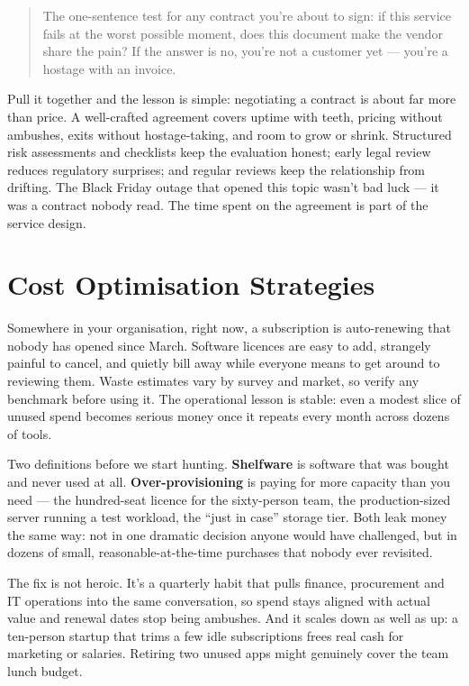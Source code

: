 \begin{quote}\small
The one-sentence test for any contract you're about to sign: if this service fails at the worst possible moment, does this document make the vendor share the pain? If the answer is no, you're not a customer yet — you're a hostage with an invoice.
\end{quote}


Pull it together and the lesson is simple: negotiating a contract is about far more than price. A well-crafted agreement covers uptime with teeth, pricing without ambushes, exits without hostage-taking, and room to grow or shrink. Structured risk assessments and checklists keep the evaluation honest; early legal review reduces regulatory surprises; and regular reviews keep the relationship from drifting. The Black Friday outage that opened this topic wasn't bad luck — it was a contract nobody read. The time spent on the agreement is part of the service design.

\section{Cost Optimisation Strategies}
Somewhere in your organisation, right now, a subscription is auto-renewing that nobody has opened since March. Software licences are easy to add, strangely painful to cancel, and quietly bill away while everyone means to get around to reviewing them. Waste estimates vary by survey and market, so verify any benchmark before using it. The operational lesson is stable: even a modest slice of unused spend becomes serious money once it repeats every month across dozens of tools.


Two definitions before we start hunting. \textbf{Shelfware} is software that was bought and never used at all. \textbf{Over-provisioning} is paying for more capacity than you need — the hundred-seat licence for the sixty-person team, the production-sized server running a test workload, the ``just in case'' storage tier. Both leak money the same way: not in one dramatic decision anyone would have challenged, but in dozens of small, reasonable-at-the-time purchases that nobody ever revisited.


The fix is not heroic. It's a quarterly habit that pulls finance, procurement and IT operations into the same conversation, so spend stays aligned with actual value and renewal dates stop being ambushes. And it scales down as well as up: a ten-person startup that trims a few idle subscriptions frees real cash for marketing or salaries. Retiring two unused apps might genuinely cover the team lunch budget.



